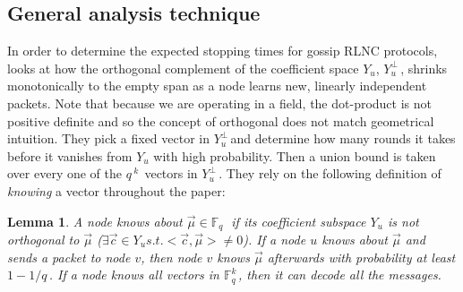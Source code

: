\documentclass{article} %
\newtheorem{lemma}[theorem]{Lemma}
\def\numMessages{\textit{k}\,}
\def\fieldSize{\textit{q}\,}
\def\dualSpace{$Y_u^{\perp}$\,}
\def\field{\mathbb{F}_{\fieldSize}\,}
\begin{document}
\subsection{General analysis technique}
In order to determine the expected stopping times for gossip RLNC protocols, \cite{haeupler2011analyzing} looks at how the orthogonal complement of the coefficient space $Y_u$, \dualSpace, shrinks monotonically to the empty span as a node learns new, linearly independent packets. Note that because we are operating in a field, the dot-product is not positive definite and so the concept of orthogonal does not match geometrical intuition.  They pick a fixed vector in \dualSpace and determine how many rounds it takes before it vanishes from $Y_u$ with high probability. Then a union bound is taken over every one of the $\fieldSize^{\numMessages}$ vectors in \dualSpace. They rely on the following definition of \textit{knowing} a vector throughout the paper:
\begin{lemma}
A node knows about $\vec{\mu} \in \field$ if its coefficient subspace $Y_u$ is not orthogonal to $\vec{\mu}$ ($\exists \vec{c} \in Y_u s.t. <\vec{c},\vec{\mu}>\neq0$). If a node $u$ knows about $\vec{\mu}$ and sends a packet to node $v$, then node $v$ knows $\vec{\mu}$ afterwards with probability at least $1-1/\fieldSize$. If a node knows all vectors in $\mathbb{F}_{\fieldSize}^{\numMessages}$, then it can decode all the messages.
\end{lemma}
\end{document}
